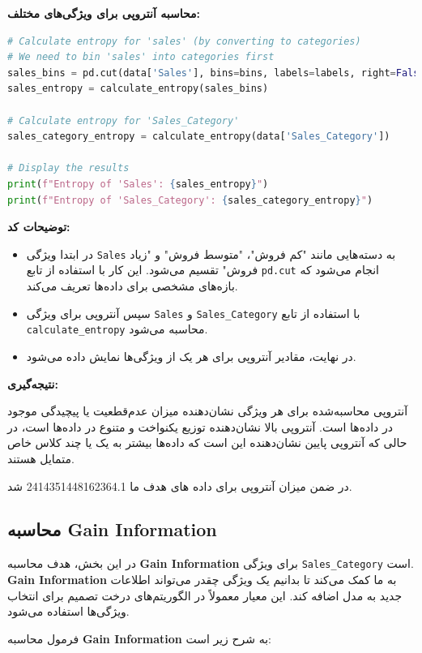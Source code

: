 \documentclass{article}
\begin{document}
\textbf{محاسبه آنتروپی برای ویژگی‌های مختلف:}

\begin{lstlisting}[language=Python]
# Calculate entropy for 'sales' (by converting to categories)
# We need to bin 'sales' into categories first
sales_bins = pd.cut(data['Sales'], bins=bins, labels=labels, right=False)
sales_entropy = calculate_entropy(sales_bins)

# Calculate entropy for 'Sales_Category'
sales_category_entropy = calculate_entropy(data['Sales_Category'])

# Display the results
print(f"Entropy of 'Sales': {sales_entropy}")
print(f"Entropy of 'Sales_Category': {sales_category_entropy}")
\end{lstlisting}

\textbf{توضیحات کد:}

\begin{itemize}
    \item در ابتدا ویژگی \texttt{Sales} به دسته‌هایی مانند "کم فروش"، "متوسط فروش" و "زیاد فروش" تقسیم می‌شود. این کار با استفاده از تابع \texttt{pd.cut} انجام می‌شود که بازه‌های مشخصی برای داده‌ها تعریف می‌کند.
    \item سپس آنتروپی برای ویژگی \texttt{Sales} و \texttt{Sales\_Category} با استفاده از تابع \texttt{calculate\_entropy} محاسبه می‌شود.
    \item در نهایت، مقادیر آنتروپی برای هر یک از ویژگی‌ها نمایش داده می‌شود.
\end{itemize}

\textbf{نتیجه‌گیری:
}

آنتروپی محاسبه‌شده برای هر ویژگی نشان‌دهنده میزان عدم‌قطعیت یا پیچیدگی موجود در داده‌ها است. آنتروپی بالا نشان‌دهنده توزیع یکنواخت و متنوع در داده‌ها است، در حالی که آنتروپی پایین نشان‌دهنده این است که داده‌ها بیشتر به یک یا چند کلاس خاص متمایل هستند.

در ضمن میزان آنتروپی برای داده های هدف ما 2414351448162364.1 شد.

\subsection{محاسبه Gain Information}


در این بخش، هدف محاسبه \textbf{Gain Information} برای ویژگی \texttt{Sales\_Category} است. \textbf{Gain Information} به ما کمک می‌کند تا بدانیم یک ویژگی چقدر می‌تواند اطلاعات جدید به مدل اضافه کند. این معیار معمولاً در الگوریتم‌های درخت تصمیم برای انتخاب ویژگی‌ها استفاده می‌شود.

فرمول محاسبه \textbf{Gain Information} به شرح زیر است:
\end{document}

